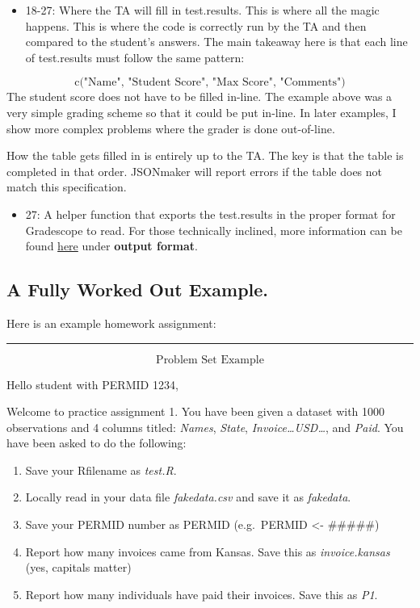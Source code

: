 \documentclass[
]{article}
\providecommand{\tightlist}{%
  \setlength{\itemsep}{0pt}\setlength{\parskip}{0pt}}
\begin{document}
\begin{itemize}
\tightlist
\item
  18-27: Where the TA will fill in test.results. This is where all the
  magic happens. This is where the code is correctly run by the TA and
  then compared to the student's answers. The main takeaway here is that
  each line of test.results must follow the same pattern:
\end{itemize}

\[\text{c("Name", "Student Score", "Max Score", "Comments")}\] The
student score does not have to be filled in-line. The example above was
a very simple grading scheme so that it could be put in-line. In later
examples, I show more complex problems where the grader is done
out-of-line.

How the table gets filled in is entirely up to the TA. The key is that
the table is completed in that order. JSONmaker will report errors if
the table does not match this specification.

\begin{itemize}
\tightlist
\item
  27: A helper function that exports the test.results in the proper
  format for Gradescope to read. For those technically inclined, more
  information can be found
  \href{https://gradescope-autograders.readthedocs.io/en/latest/specs/\#output-format}{here}
  under \textbf{output format}.
\end{itemize}

\hypertarget{a-fully-worked-out-example.}{%
\subsection{A Fully Worked Out
Example.}\label{a-fully-worked-out-example.}}

Here is an example homework assignment:

\begin{center}\rule{0.5\linewidth}{0.5pt}\end{center}

\[\text{Problem Set Example}\]

Hello student with PERMID 1234,

Welcome to practice assignment 1. You have been given a dataset with
1000 observations and 4 columns titled: \emph{Names}, \emph{State},
\emph{Invoice\ldots USD\ldots{}}, and \emph{Paid}. You have been asked
to do the following:

\begin{enumerate}
\def\labelenumi{\arabic{enumi})}
\tightlist
\item
  Save your Rfilename as \emph{test.R}.
\item
  Locally read in your data file \emph{fakedata.csv} and save it as
  \emph{fakedata}.
\item
  Save your PERMID number as PERMID (e.g.~PERMID \textless- \#\#\#\#\#)
\item
  Report how many invoices came from Kansas. Save this as
  \emph{invoice.kansas} (yes, capitals matter)
\item
  Report how many individuals have paid their invoices. Save this as
  \emph{P1}.
\end{enumerate}
\end{document}
